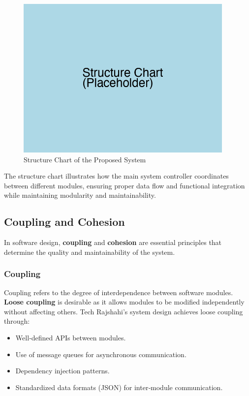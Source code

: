 \documentclass[12pt,a4paper]{article}
\begin{document}
\begin{figure}[H]
    \centering
    \includegraphics[width=0.95\textwidth]{Fig/structure_chart.png}
    \caption{Structure Chart of the Proposed System}
    \label{fig:structure_chart}
\end{figure}

The structure chart illustrates how the main system controller coordinates between different modules, ensuring proper data flow and functional integration while maintaining modularity and maintainability.

\subsection{Coupling and Cohesion}
In software design, \textbf{coupling} and \textbf{cohesion} are essential principles that determine the quality and maintainability of the system.

\subsubsection{Coupling}
Coupling refers to the degree of interdependence between software modules.  \textbf{Loose coupling} is desirable as it allows modules to be modified independently without affecting others.  Tech Rajshahi's system design achieves loose coupling through:
\begin{itemize}
    \item Well‑defined APIs between modules.
    \item Use of message queues for asynchronous communication.
    \item Dependency injection patterns.
    \item Standardized data formats (JSON) for inter‑module communication.
\end{itemize}
\end{document}
